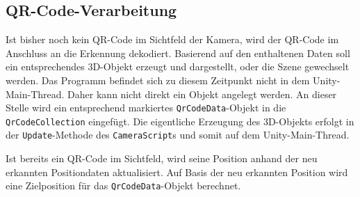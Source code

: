 \subsection{QR-Code-Verarbeitung}
Ist bisher noch kein QR-Code im Sichtfeld der Kamera, wird der QR-Code im Anschluss an die Erkennung dekodiert. Basierend auf den enthaltenen Daten soll ein entsprechendes 3D-Objekt erzeugt und dargestellt, oder die Szene gewechselt werden. Das Programm befindet sich zu diesem Zeitpunkt nicht in dem Unity-Main-Thread. Daher kann nicht direkt ein Objekt angelegt werden. An dieser Stelle wird ein entsprechend markiertes \texttt{QrCodeData}-Objekt in die \texttt{QrCodeCollection} eingefügt. Die eigentliche Erzeugung des 3D-Objekts erfolgt in der \texttt{Update}-Methode des \texttt{CameraScript}s und somit auf dem Unity-Main-Thread.

Ist bereits ein QR-Code im Sichtfeld, wird seine Position anhand der neu erkannten Positiondaten aktualisiert. Auf Basis der neu erkannten Position wird eine Zielposition für das \texttt{QrCodeData}-Objekt berechnet.

